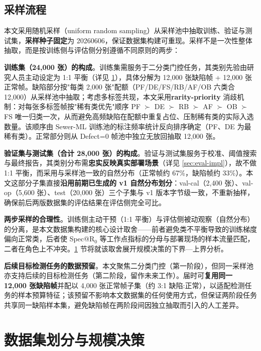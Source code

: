 \documentclass[UTF8,openany,12pt]{ctexbook}
\begin{document}
\subsection{采样流程}
本文采用随机采样（uniform random sampling）从采样池中抽取训练、验证与测试集，\textbf{采样种子固定}为 20260606，保证数据集构建可重现。采样不是一次性整体抽取，而是按训练侧与评估侧分别遵循不同原则的两步：

\textbf{训练集（24{,}000 张）的构成}。训练集需服务于二分类门控任务，其类别先验由研究人员主动设定为 1:1 平衡（详见 \ref{sec:split-sizes}），具体分解为 12{,}000 张缺陷帧 + 12{,}000 张正常帧。缺陷部分按"每类 2{,}000 张"配额（PF/DE/FS/RB/AF/OB 六类合 12{,}000）从采样池中抽取；考虑多标签共现，本文采用\textbf{rarity-priority} 消歧机制：对每张多标签帧按"稀有类优先"顺序 PF $\succ$ DE $\succ$ RB $\succ$ AF $\succ$ OB $\succ$ FS 唯一归类一次，从而避免高频缺陷在配额中重复占位、压制稀有类的实际入选数量。该顺序由 Sewer-ML 训练池的标注频率统计反向排序确定（PF、DE 为最稀有类）。正常部分则从 Defect=0 帧池中独立无放回抽取 12{,}000 张。

\textbf{验证集与测试集（合计 28{,}000 张）的构成}。验证与测试集服务于校准、阈值搜索与最终报告，其类别分布需\textbf{忠实反映真实部署场景}（详见 \ref{sec:eval-impl}），故不做 1:1 平衡，而采用与采样池一致的自然分布（正常帧约 67\%，缺陷帧约 33\%）。本文这部分子集直接\textbf{沿用前期已生成的 v1 自然分布划分}：val-cal（2{,}400 张）、val-op（5{,}600 张）、test（20{,}000 张）三个子集与 v1 版本字节级一致，不重新抽样，确保前后两版数据集的评估结果在评估侧完全可比。

\textbf{两步采样的合理性}。训练侧主动干预（1:1 平衡）与评估侧被动观察（自然分布）的分离，是本文数据集构建的核心设计取舍——前者避免类不平衡导致的训练梯度偏向正常类，后者使 Spec@R$_0$ 等工作点指标的分母与部署现场的样本流量匹配，二者在角色上不冲突。\ref{sec:split-sizes} 节将就该取舍展开规模决策的下界—上界分析。

\textbf{后续目标检测任务的数据预留}。本文聚焦二分类门控（第一阶段），但同一采样池亦支持后续的目标检测任务（第二阶段，留作未来工作）。届时可\textbf{复用同一 12{,}000 张缺陷帧}并配以 4{,}000 张正常帧子集（约 3:1 缺陷:正常），以适配检测任务的样本预算特征；该预留不影响本文数据集的任何使用方式，但保证两阶段任务共享同一缺陷样本集，避免缺陷帧在两阶段间因独立抽取而引入的人工差异。

\section{数据集划分与规模决策}
\label{sec:split-sizes}
\end{document}
